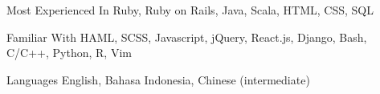 


\begin{cvskills}


	\cvskill
	{Most Experienced In}
	{Ruby, Ruby on Rails, Java, Scala, HTML, CSS, SQL}


	\cvskill
	{Familiar With}
	{HAML, SCSS, Javascript, jQuery, React.js, Django, Bash, C/C++, Python, R, Vim}


	\cvskill
	{Languages}
	{English, Bahasa Indonesia, Chinese (intermediate)}


\end{cvskills}
